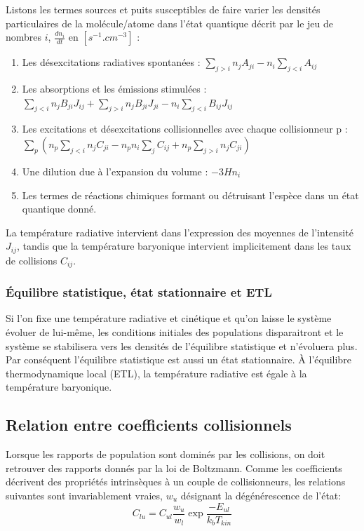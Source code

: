 \documentclass[10pt, a4paper]{report}
\numberwithin{equation}{subsection}
\begin{document}
Listons les termes sources et puits susceptibles de faire varier les densités particulaires de la molécule/atome dans l'état quantique décrit par le jeu de nombres $i$, $\frac{dn_i}{dt}$ en $[s^{-1}.cm^{-3}]$ :\\

\begin{enumerate}
	\item Les désexcitations radiatives spontanées : $\sum\limits_{j>i} n_jA_{ji}-n_i\sum\limits_{j<i} A_{ij}$
	\item Les absorptions et les émissions stimulées : $\sum\limits_{j<i} n_jB_{ji}J_{ij}+\sum\limits_{j>i} n_jB_{ji}J_{ji}-n_i\sum\limits_{j<i}B_{ij}J_{ij}$
	\item Les excitations et désexcitations collisionnelles avec chaque collisionneur p : \\ $\sum\limits_p\left(n_p\sum\limits_{j<i} n_j C_{ji}-n_pn_i\sum\limits_j C_{ij}+n_p\sum\limits_{j>i}n_j C_{ji}\right)$
	\item Une dilution due à l'expansion du volume : $-3Hn_i$\\
	\item Les termes de réactions chimiques formant ou détruisant l'espèce dans un état quantique donné.
\end{enumerate}
\medskip
\normalsize
La température radiative intervient dans l'expression des moyennes de l'intensité $J_{ij}$, tandis que la température baryonique intervient implicitement dans les taux de collisions $C_{ij}$. 

\subsubsection{\uppercase{é}quilibre statistique, état stationnaire et ETL}
Si l'on fixe une température radiative et cinétique et qu'on laisse le système évoluer de lui-même, les conditions initiales des populations disparaitront et le système se stabilisera vers les densités de l'équilibre statistique et n'évoluera plus. Par conséquent l'équilibre statistique est aussi un état stationnaire. À l'équilibre thermodynamique local (ETL), la température radiative est égale à la température baryonique.

\subsection{Relation entre coefficients collisionnels}
Lorsque les rapports de population sont dominés par les collisions, on doit retrouver des rapports donnés par la loi de Boltzmann. Comme les coefficients décrivent des propriétés intrinsèques à un couple de collisionneurs, les relations suivantes sont invariablement vraies, $w_u$ désignant la dégénérescence de l'état:
\begin{equation} \label{eq:DB}
 \boxed{C_{lu} = C_{ul}\frac{w_u}{w_l}\exp{\frac{-E_{ul}}{k_b T_{kin}}}}
\end{equation}
\end{document}
